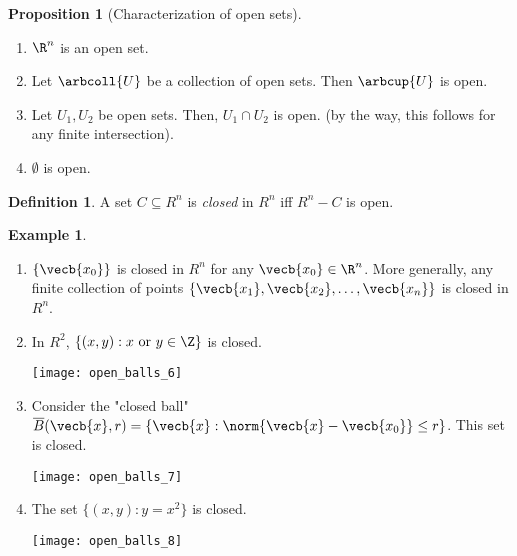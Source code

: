 \documentclass[a5paper]{article}
\theoremstyle{definition}%
\newtheorem{proposition}[theorem]{Proposition}
\newtheorem*{definition*}{Definition}
\newtheorem*{example*}{Example}
\numberwithin{exercise}{section}
\theoremstyle{remark}%
\begin{document}
\begin{highlight}
\begin{proposition}[Characterization of open sets]\mbox{}
\begin{enumerate}[label=(\alph*)]
\item $\R^n$ is an open set. 
\item Let $\arbcoll{U}$ be a collection of open sets. Then $\arbcup{U}$ is open. 
\item Let $U_1, U_2$ be open sets. Then, $U_1\cap U_2$ is open. (by the way, this follows for any finite intersection). 
\item $\emptyset$ is open. 
\end{enumerate}
\end{proposition}
\end{highlight}

\begin{highlight}
\begin{definition*}
A set $C\subseteq R^n$ is \emph{closed} in $R^n$ iff $R^n-C$ is open. 
\end{definition*}
\end{highlight}

\begin{example*}\mbox{}
\begin{enumerate}
\item $\{\vecb{x_0}\}$ is closed in $R^n$ for any $\vecb{x_0}\in\R^n$. More generally, any finite collection of points $\{\vecb{x_1}, \vecb{x_2}, \ldots, \vecb{x_n}\}$ is closed in $R^n$. 

\item In $R^2$, $\{(x,y): x \text{ or } y \in \Z\}$ is closed. 
\begin{center}
\texttt{[image: open\_balls\_6]}
\end{center}

\item Consider the "closed ball" $\overline{B}(\vecb{x},r)=\{\vecb{x}:\norm{\vecb{x}-\vecb{x_0}}\leq r\}$. This set is closed. 
\begin{center}
\texttt{[image: open\_balls\_7]}
\end{center}

\item The set $\{(x,y):y=x^2\}$ is closed. 
\begin{center}
\texttt{[image: open\_balls\_8]}
\end{center}

\end{enumerate}
\end{example*}
\end{document}
